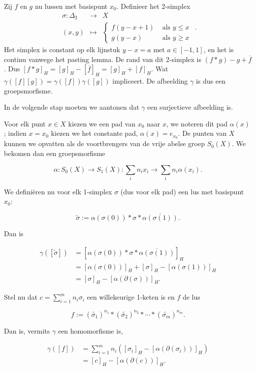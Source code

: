 \documentclass[12pt]{book}
\begin{document}
Zij $f$ en $g$ nu lussen met basispunt $x_0$. Definieer het 2-simplex 
$$\begin{array}{rcl} 
\sigma:\Delta_2 & \to & X\\
(x,y) & \mapsto & \left\{\begin{array}{ll}
f(y-x+1) & \mbox{ als } y \leq x \\
g(y-x) & \mbox{ als } y\geq x
\end{array}\right.
\end{array}.$$
Het simplex is constant op elk lijnstuk $y-x=a$ met $a\in [-1,1]$, en het is continu vanwege het pasting lemma.
De rand van dit 2-simplex is $(f*g)-g+\overline{f}$. Dus
$[f*g]_H=[g]_{H}-[\overline{f}]_{H}=[g]_{H}+[f]_{H}.$ Wat $\gamma([f][g])=\gamma([f])\gamma([g])$ impliceert. De afbeelding
$\gamma$ is dus een groepsmorfisme.

In de volgende stap moeten we aantonen dat $\gamma$ een surjectieve afbeelding is. 

Voor elk punt $x\in X$ kiezen we een pad van $x_0$ naar $x$, we noteren dit pad $\alpha (x)$; indien $x=x_0$  kiezen we het constante pad, $\alpha(x)=e_{x_{0}}$. De punten van $X$ kunnen we opvatten als de voortbrengers van de vrije abelse groep $S_{0}(X)$. We bekomen dan een groepsmorfisme 

$$\alpha:S_{0}(X) \to S_{1}(X): \sum_i n_i x_i\to \sum_i n_i \alpha(x_{i}).$$

We defini\"eren nu voor elk 1-simplex $\sigma$ (dus voor elk pad) een lus met basispunt $x_0$:

$$\tilde{\sigma}:=\alpha(\sigma(0))*\sigma*\overline{\alpha(\sigma(1))}.$$

Dan is

\begin{align*}
\gamma([\tilde{\sigma}]) & =  [\alpha(\sigma(0))*\sigma*\overline{\alpha(\sigma(1))}]_H\\
& =  [\alpha(\sigma(0))]_H+[\sigma]_H-[\alpha(\sigma(1))]_H\\
& = [\sigma]_H-[\alpha(\partial(\sigma))]_H.\end{align*}

Stel nu dat $c=\sum_{i=1}^{m}n_i \sigma_i$  een willekeurige 1-keten is en $f$  de lus

$$f:=(\tilde{\sigma_1})^{n_{1}}*(\tilde{\sigma_2})^{n_{2}}*\cdots *(\tilde{\sigma_m})^{n_{m}}.$$

Dan is, vermits $\gamma$ een homomorfisme is, 

\begin{align*}\gamma([f]) & =  \sum_{i=1}^{m} n_i([\sigma_i]_H-[\alpha(\partial(\sigma_{i}))]_H)\\
& =  [c]_H-[\alpha(\partial(c))]_H.\end{align*}
\end{document}
